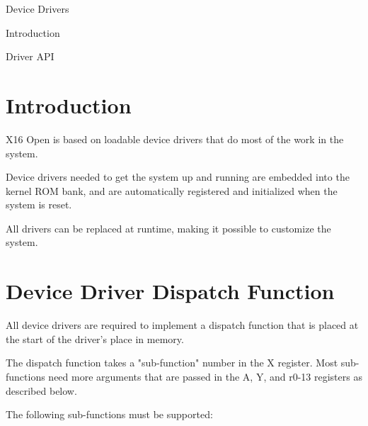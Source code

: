 \begin{chapterpage}{Device Drivers}
    \begin{chapteritems}
        \item Introduction
        \item Driver API
    \end{chapteritems}
\end{chapterpage}

\section{Introduction}

X16 Open is based on loadable device drivers that do most of the work in
the system.

Device drivers needed to get the system up and running are embedded into
the kernel ROM bank, and are automatically registered and initialized when
the system is reset.

All drivers can be replaced at runtime, making it possible to
customize the system.


\section{Device Driver Dispatch Function}

All device drivers are required to implement a dispatch function that is placed at the
start of the driver's place in memory.

The dispatch function takes a "sub-function" number in the X register. Most sub-functions
need more arguments that are passed in the A, Y, and r0-13 registers as 
described below.

The following sub-functions must be supported:

